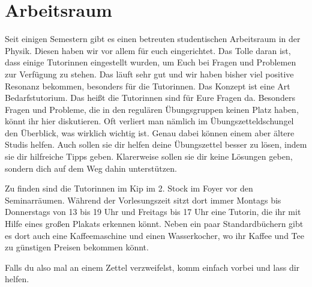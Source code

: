 \section{Arbeitsraum}
\label{sec:arbeitsraum}
Seit einigen Semestern gibt es einen betreuten studentischen Arbeitsraum in der Physik. Diesen haben wir vor allem für euch eingerichtet. Das Tolle daran ist, dass einige Tutorinnen eingestellt wurden, um Euch bei Fragen und Problemen zur Verfügung zu stehen. Das läuft sehr gut und wir haben bisher viel positive Resonanz bekommen, besonders für die Tutorinnen. Das Konzept ist eine Art Bedarfstutorium. Das heißt die Tutorinnen sind für Eure Fragen da. Besonders Fragen und Probleme, die in den regulären Übungsgruppen keinen Platz haben, könnt ihr hier diskutieren. Oft verliert man nämlich im Übungszetteldschungel den Überblick, was wirklich wichtig ist. Genau dabei können einem aber ältere Studis helfen. Auch sollen sie dir helfen deine Übungszettel besser zu lösen, indem sie dir hilfreiche Tipps geben. Klarerweise sollen sie dir keine Lösungen geben, sondern dich auf dem Weg dahin unterstützen.

Zu finden sind die Tutorinnen im Kip im 2. Stock im Foyer vor den Seminarräumen. Während der Vorlesungszeit sitzt dort immer Montags bis Donnerstags von 13 bis 19 Uhr und Freitags bis 17 Uhr eine Tutorin, die ihr mit Hilfe eines großen Plakats erkennen könnt. Neben ein paar Standardbüchern gibt es dort auch eine Kaffeemaschine und einen Wasserkocher, wo ihr Kaffee und Tee zu günstigen Preisen bekommen könnt.

Falls du also mal an einem Zettel verzweifelst, komm einfach vorbei und lass dir helfen.
